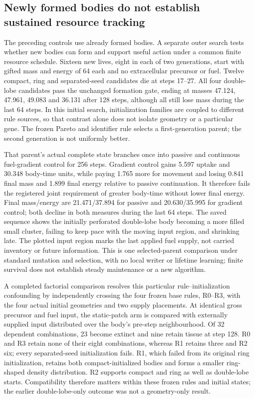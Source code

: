 \subsection*{Newly formed bodies do not establish sustained resource tracking}
The preceding controls use already formed bodies. A separate outer search tests whether new bodies can form and support useful action under a common finite resource schedule. Sixteen new lives, eight in each of two generations, start with gifted mass and energy of 64 each and no extracellular precursor or fuel. Twelve compact, ring and separated-seed candidates die at steps 17--27. All four double-lobe candidates pass the unchanged formation gate, ending at masses 47.124, 47.961, 49.083 and 36.131 after 128 steps, although all still lose mass during the last 64 steps. In this initial search, initialization families are coupled to different rule sources, so that contrast alone does not isolate geometry or a particular gene. The frozen Pareto and identifier rule selects a first-generation parent; the second generation is not uniformly better.

That parent's actual complete state branches once into passive and continuous fuel-gradient control for 256 steps. Gradient control gains 5.597 uptake and 30.348 body-time units, while paying 1.765 more for movement and losing 0.841 final mass and 1.899 final energy relative to passive continuation. It therefore fails the registered joint requirement of greater body-time without lower final energy. Final mass/energy are 21.471/37.894 for passive and 20.630/35.995 for gradient control; both decline in both measures during the last 64 steps. The saved sequence shows the initially perforated double-lobe body becoming a more filled small cluster, failing to keep pace with the moving input region, and shrinking late. The plotted input region marks the last applied fuel supply, not carried inventory or future information. This is one selected-parent comparison under standard mutation and selection, with no local writer or lifetime learning; finite survival does not establish steady maintenance or a new algorithm.

A completed factorial comparison resolves this particular rule--initialization confounding by independently crossing the four frozen base rules, R0--R3, with the four actual initial geometries and two supply placements. At identical gross precursor and fuel input, the static-patch arm is compared with externally supplied input distributed over the body's pre-step neighbourhood. Of 32 dependent combinations, 23 become extinct and nine retain tissue at step 128. R0 and R3 retain none of their eight combinations, whereas R1 retains three and R2 six; every separated-seed initialization fails. R1, which failed from its original ring initialization, retains both compact-initialized bodies and forms a smaller ring-shaped density distribution. R2 supports compact and ring as well as double-lobe starts. Compatibility therefore matters within these frozen rules and initial states; the earlier double-lobe-only outcome was not a geometry-only result.

